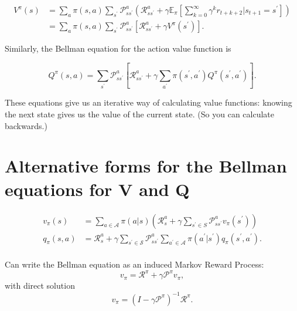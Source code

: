 \documentclass[20pt]{extarticle}
\theoremstyle{plain}
\theoremstyle{definition}
\theoremstyle{remark}
\newcommand{\0}{\varnothing}
\newcommand{\<}{\langle}
\renewcommand{\>}{\rangle}
\begin{document}
\begin{align*}
V ^ { \pi } ( s ) &= \sum _ { a } \pi ( s , a ) \sum _ { s ^ { \prime } } \mathcal { P } _ { s s ^ { \prime } } ^ { a } \left( \mathcal { R } _ { s s ^ { \prime } } ^ { a } + \gamma \mathbb { E } _ { \pi } \left[ \sum _ { k = 0 } ^ { \infty } \gamma ^ { k } r _ { t + k + 2 } \bigg| s _ { t + 1 } = s ^ { \prime } \right] \right) \\
&= \sum _ { a } \pi ( s , a ) \sum _ { s ^ { \prime } } \mathcal { P } _ { s s ^ { \prime } } ^ { a } \left[ \mathcal { R } _ { s s ^ { \prime } } ^ { a } + \gamma V ^ { \pi } \left( s ^ { \prime } \right) \right].
\end{align*}

Similarly, the Bellman equation for the action value function is

\[
Q ^ { \pi } ( s , a ) = \sum _ { s ^ { \prime } } \mathcal { P } _ { s s ^ { \prime } } ^ { a } \left[ \mathcal { R } _ { s s ^ { \prime } } ^ { a } + \gamma \sum _ { a ^ { \prime } } \pi \left( s ^ { \prime } , a ^ { \prime } \right) Q ^ { \pi } \left( s ^ { \prime } , a ^ { \prime } \right) \right].
\]

These equations give us an iterative way of calculating value functions: knowing the next state gives us the value of the current state. (So you can calculate backwards.)

\section{Alternative forms for the Bellman equations for V and Q}

\begin{align*}
v _ { \pi } ( s ) &= \sum _ { a \in \mathcal { A } } \pi ( a | s ) \left( \mathcal { R } _ { s } ^ { a } + \gamma \sum _ { s ^ { \prime } \in S } \mathcal { P } _ { s s ^ { \prime } } ^ { a } v _ { \pi } \left( s ^ { \prime } \right) \right) \\
q _ { \pi } ( s , a ) &= \mathcal { R } _ { s } ^ { a } + \gamma \sum _ { s ^ { \prime } \in \mathcal { S } } \mathcal { P } _ { s s ^ { \prime } } ^ { a } \sum _ { a ^ { \prime } \in \mathcal { A } } \pi \left( a ^ { \prime } | s ^ { \prime } \right) q _ { \pi } \left( s ^ { \prime } , a ^ { \prime } \right). \\
\end{align*}

Can write the Bellman equation as an induced Markov Reward Process:
\[
v _ { \pi } = \mathcal { R } ^ { \pi } + \gamma \mathcal { P } ^ { \pi } v _ { \pi },
\]
with direct solution
\[
v _ { \pi } = \left( I - \gamma \mathcal { P } ^ { \pi } \right) ^ { - 1 } \mathcal { R } ^ { \pi }.
\]
\end{document}
